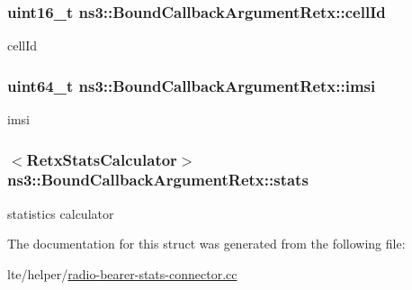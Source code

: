 \subsubsection[{\texorpdfstring{cell\+Id}{cellId}}]{\setlength{\rightskip}{0pt plus 5cm}uint16\+\_\+t ns3\+::\+Bound\+Callback\+Argument\+Retx\+::cell\+Id}\hypertarget{structns3_1_1BoundCallbackArgumentRetx_a9fb34a0b0833d5f58866e3441fef396c}{}\label{structns3_1_1BoundCallbackArgumentRetx_a9fb34a0b0833d5f58866e3441fef396c}


cell\+Id 

\subsubsection[{\texorpdfstring{imsi}{imsi}}]{\setlength{\rightskip}{0pt plus 5cm}uint64\+\_\+t ns3\+::\+Bound\+Callback\+Argument\+Retx\+::imsi}\hypertarget{structns3_1_1BoundCallbackArgumentRetx_a68946e052d7802b9bc07b9d66c548a44}{}\label{structns3_1_1BoundCallbackArgumentRetx_a68946e052d7802b9bc07b9d66c548a44}


imsi 

\subsubsection[{\texorpdfstring{stats}{stats}}]{$<${\bf Retx\+Stats\+Calculator}$>$ ns3\+::\+Bound\+Callback\+Argument\+Retx\+::stats}\hypertarget{structns3_1_1BoundCallbackArgumentRetx_a1ab102f4e151efed213a59f75d62a3e7}{}\label{structns3_1_1BoundCallbackArgumentRetx_a1ab102f4e151efed213a59f75d62a3e7}


statistics calculator 



The documentation for this struct was generated from the following file\+:\begin{DoxyCompactItemize}
\item 
lte/helper/\hyperlink{radio-bearer-stats-connector_8cc}{radio-\/bearer-\/stats-\/connector.\+cc}\end{DoxyCompactItemize}
